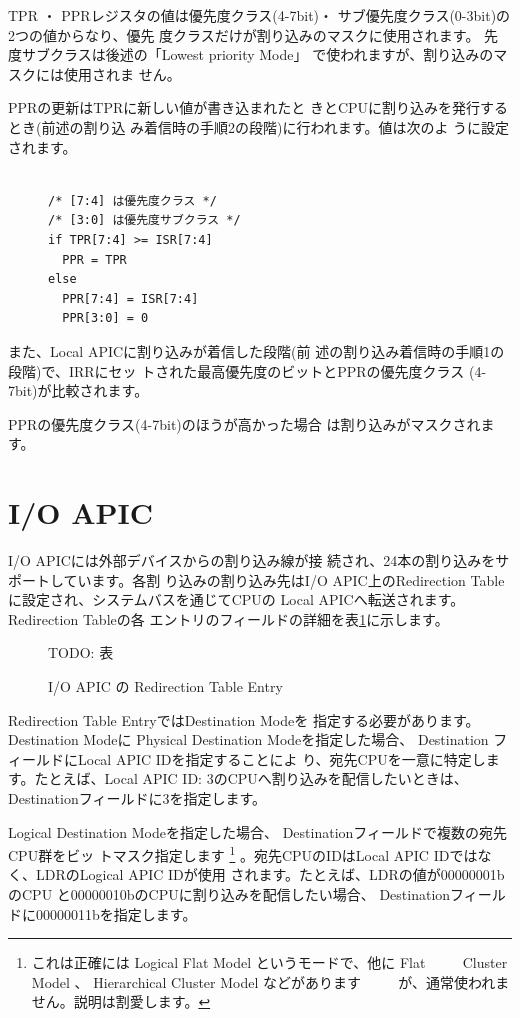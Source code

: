  TPR ・ PPRレジスタの値は優先度クラス(4-7bit)・
サブ優先度クラス(0-3bit)の2つの値からなり、優先
度クラスだけが割り込みのマスクに使用されます。
先度サブクラスは後述の「Lowest priority Mode」
で使われますが、割り込みのマスクには使用されま
せん。

 PPRの更新はTPRに新しい値が書き込まれたと
きとCPUに割り込みを発行するとき(前述の割り込
み着信時の手順2の段階)に行われます。値は次のよ
うに設定されます。

\begin{figure}\centering
\begin{verbatim}

/* [7:4] は優先度クラス */
/* [3:0] は優先度サブクラス */
if TPR[7:4] >= ISR[7:4]
  PPR = TPR
else
  PPR[7:4] = ISR[7:4]
  PPR[3:0] = 0
\end{verbatim}
\end{figure}

 また、Local APICに割り込みが着信した段階(前
述の割り込み着信時の手順1の段階)で、IRRにセッ
トされた最高優先度のビットとPPRの優先度クラス
(4-7bit)が比較されます。

PPRの優先度クラス(4-7bit)のほうが高かった場合
は割り込みがマスクされます。


\section{I/O APIC}

 I/O APICには外部デバイスからの割り込み線が接
続され、24本の割り込みをサポートしています。各割
り込みの割り込み先はI/O APIC上のRedirection
Tableに設定され、システムバスを通じてCPUの
Local APICへ転送されます。Redirection Tableの各
エントリのフィールドの詳細を表\ref{table2}に示します。

\begin{figure}\centering
TODO: 表
\caption{I/O APIC の Redirection Table Entry}
\label{table2}
\end{figure}

 Redirection Table EntryではDestination Modeを
指定する必要があります。Destination Modeに
Physical Destination Modeを指定した場合、 Destination
フィールドにLocal APIC IDを指定することによ
り、宛先CPUを一意に特定します。たとえば、Local
APIC ID: 3のCPUへ割り込みを配信したいときは、
Destinationフィールドに3を指定します。

 Logical Destination Modeを指定した場合、
Destinationフィールドで複数の宛先CPU群をビッ
トマスク指定します
\footnote{これは正確には Logical Flat Model というモードで、他に Flat
　　   Cluster Model 、 Hierarchical Cluster Model などがあります
　　   が、通常使われません。説明は割愛します。}
。宛先CPUのIDはLocal
APIC IDではなく、LDRのLogical APIC IDが使用
されます。たとえば、LDRの値が00000001bのCPU
と00000010bのCPUに割り込みを配信したい場合、
Destinationフィールドに00000011bを指定します。

